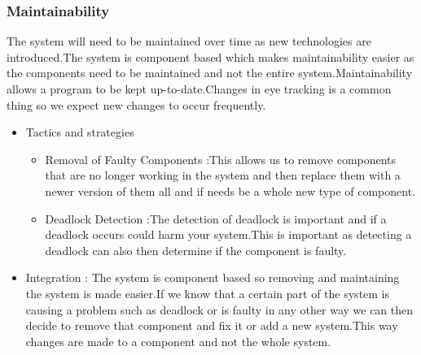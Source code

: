 \subsubsection{Maintainability}
\begin{flushleft}
The system will need to be maintained over time as new technologies are introduced.The system is component based which makes maintainability easier as the components need to be maintained and not the entire system.Maintainability allows a program to be kept up-to-date.Changes in eye tracking is a common thing so we expect new changes to occur frequently.
\begin{itemize}
\item{Tactics and strategies}
\begin{itemize}
\item{Removal of Faulty Components} :This allows us to remove components that are no longer working in the system and then replace them with a newer version of them all and if needs be a whole new type of component.
\item{Deadlock Detection} :The detection of deadlock is important and if a deadlock occurs could harm your system.This is important as detecting a deadlock can also then determine if the component is faulty.
\end{itemize}

\item{Integration} :
The system is component based so removing and maintaining the system is made easier.If we know that a certain part of the system is causing a problem such as deadlock or is faulty in any other way we can then  decide to remove that component and fix it or add a new system.This way changes are made to a component and not the whole system.
\end{itemize}

\end{flushleft}
		
